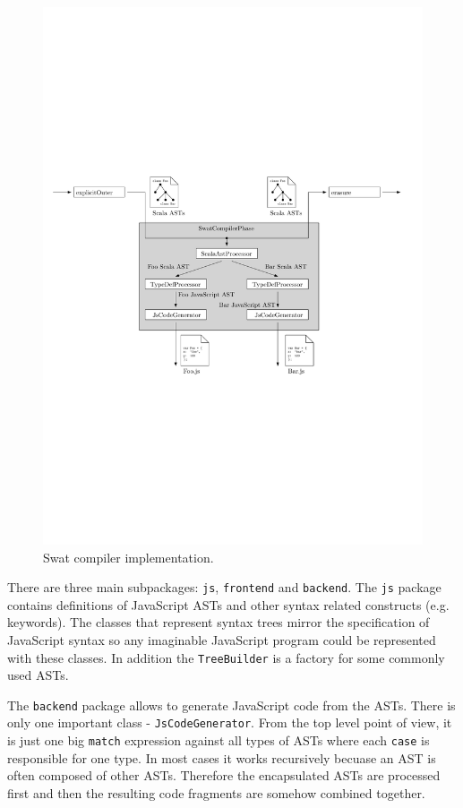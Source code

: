 \documentclass[12pt,a4paper]{report}
\begin{document}
\begin{figure}[ht]
  \centering
	\includegraphics[width=\linewidth,height=\textheight,keepaspectratio]{img/SwatCompiler.pdf}
	\caption{Swat compiler implementation.}
	\label{SwatCompiler}
\end{figure}

There are three main subpackages: \texttt{js}, \texttt{frontend} and \texttt{backend}. The \texttt{js} package contains definitions of JavaScript ASTs and other syntax related constructs (e.g. keywords). The classes that represent syntax trees mirror the specification of JavaScript syntax\cite{EcmaScript} so any imaginable JavaScript program could be represented with these classes. In addition the \texttt{TreeBuilder} is a factory for some commonly used ASTs.

The \texttt{backend} package allows to generate JavaScript code from the ASTs. There is only one important class - \texttt{JsCodeGenerator}. From the top level point of view, it is just one big \texttt{match} expression against all types of ASTs where each \texttt{case} is responsible for one type. In most cases it works recursively becuase an AST is often composed of other ASTs. Therefore the encapsulated ASTs are processed first and then the resulting code fragments are somehow combined together.
\end{document}

